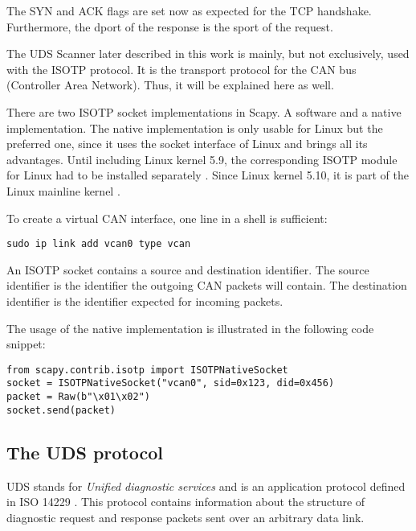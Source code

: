 The SYN and ACK flags are set now as expected for the TCP handshake. Furthermore, the dport of the response is the sport of the request.

The UDS Scanner later described in this work is mainly, but not exclusively, used with the ISOTP protocol. It is the transport protocol for the CAN bus (Controller Area Network). Thus, it will be explained here as well.

There are two ISOTP socket implementations in Scapy. A software and a native implementation. The native implementation is only usable for Linux but the preferred one, since it uses the socket interface of Linux and brings all its advantages. Until including Linux kernel 5.9, the corresponding ISOTP module for Linux had to be installed separately \cite{isotp-module}. Since Linux kernel 5.10, it is part of the Linux mainline kernel \cite{isotp-commit}.

To create a virtual CAN interface, one line in a shell is sufficient:
\begin{samepage}
\begin{verbatim}
sudo ip link add vcan0 type vcan
\end{verbatim}
\end{samepage}

An ISOTP socket contains a source and destination identifier. The source identifier is the identifier the outgoing CAN packets will contain. The destination identifier is the identifier expected for incoming packets.

The usage of the native implementation is illustrated in the following code snippet:

\begin{samepage}
\begin{verbatim}
from scapy.contrib.isotp import ISOTPNativeSocket
socket = ISOTPNativeSocket("vcan0", sid=0x123, did=0x456)
packet = Raw(b"\x01\x02")
socket.send(packet)
\end{verbatim}
\end{samepage}


\subsection{The UDS protocol}

UDS stands for \emph{Unified diagnostic services} and is an application protocol defined in ISO 14229 \cite{iso14229}. This protocol contains information about the structure of diagnostic request and response packets sent over an arbitrary data link.

